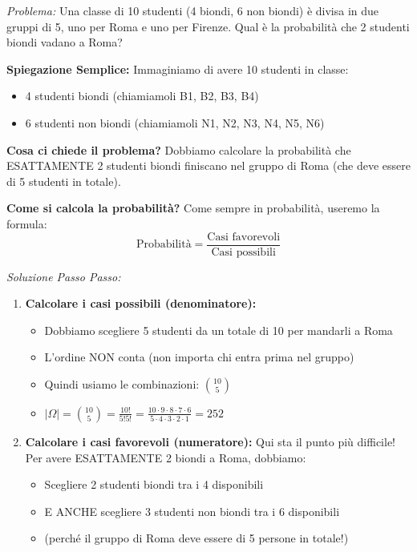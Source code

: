 \begin{example}\label{ex:studenti-roma}
\textit{Problema:} Una classe di 10 studenti (4 biondi, 6 non biondi) è divisa in due gruppi di 5, uno per Roma e uno per Firenze. Qual è la probabilità che 2 studenti biondi vadano a Roma?

\textbf{Spiegazione Semplice:}
Immaginiamo di avere 10 studenti in classe:
\begin{itemize}
    \item 4 studenti biondi (chiamiamoli B1, B2, B3, B4)
    \item 6 studenti non biondi (chiamiamoli N1, N2, N3, N4, N5, N6)
\end{itemize}

\textbf{Cosa ci chiede il problema?}
Dobbiamo calcolare la probabilità che ESATTAMENTE 2 studenti biondi finiscano nel gruppo di Roma (che deve essere di 5 studenti in totale).

\textbf{Come si calcola la probabilità?}
Come sempre in probabilità, useremo la formula:
\[ \text{Probabilità} = \frac{\text{Casi favorevoli}}{\text{Casi possibili}} \]

\textit{Soluzione Passo Passo:}
\begin{enumerate}
    \item \textbf{Calcolare i casi possibili (denominatore):}
    \begin{itemize}
        \item Dobbiamo scegliere 5 studenti da un totale di 10 per mandarli a Roma
        \item L'ordine NON conta (non importa chi entra prima nel gruppo)
        \item Quindi usiamo le combinazioni: $\binom{10}{5}$
        \item $|\Omega| = \binom{10}{5} = \frac{10!}{5!5!} = \frac{10 \cdot 9 \cdot 8 \cdot 7 \cdot 6}{5 \cdot 4 \cdot 3 \cdot 2 \cdot 1} = 252$
    \end{itemize}

    \item \textbf{Calcolare i casi favorevoli (numeratore):}
    Qui sta il punto più difficile! Per avere ESATTAMENTE 2 biondi a Roma, dobbiamo:
    \begin{itemize}
        \item Scegliere 2 studenti biondi tra i 4 disponibili
        \item E ANCHE scegliere 3 studenti non biondi tra i 6 disponibili
        \item (perché il gruppo di Roma deve essere di 5 persone in totale!)
    \end{itemize}


\end{enumerate}
\end{example}
